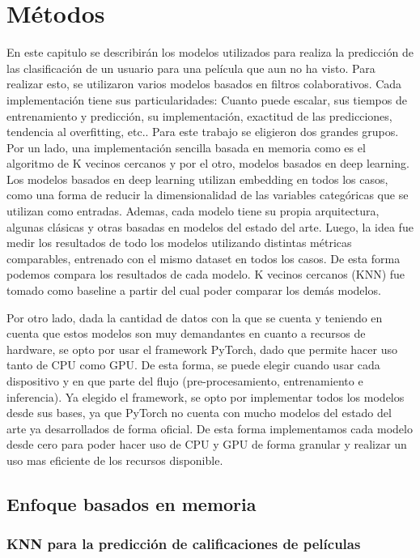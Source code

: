 \documentclass[11pt,a4paper,twoside]{thesis}
\begin{document}
\chapter{Métodos}

En este capitulo se describirán los modelos utilizados para realiza la predicción de las clasificación de un usuario para una película
que aun no ha visto. Para realizar esto, se utilizaron varios modelos basados en filtros colaborativos. Cada implementación tiene sus particularidades: 
Cuanto puede escalar, sus tiempos de entrenamiento y predicción, su implementación, exactitud de las predicciones, tendencia al overfitting, etc..
Para este trabajo se eligieron dos grandes grupos. Por un lado, una implementación sencilla basada en memoria como es el algoritmo de K vecinos cercanos y 
por el otro, modelos basados en deep learning. Los modelos basados en deep learning utilizan embedding en todos los casos, como una forma de reducir la 
dimensionalidad de las variables categóricas que se utilizan como entradas. Ademas, cada modelo tiene su propia arquitectura, algunas clásicas y otras basadas 
en modelos del estado del arte. Luego, la idea fue medir los resultados de todo los modelos utilizando distintas métricas comparables, entrenado con el mismo
dataset en todos los casos. De esta forma podemos compara los resultados de cada modelo. K vecinos cercanos (KNN) fue tomado como baseline a partir del cual 
poder comparar los demás modelos.

Por otro lado, dada la cantidad de datos con la que se cuenta y teniendo en cuenta que estos modelos son muy 
demandantes en cuanto a recursos de hardware, se opto por usar el framework PyTorch, dado que permite hacer uso tanto de CPU como GPU. 
De esta forma, se puede elegir cuando usar cada dispositivo y en que parte del flujo (pre-procesamiento, entrenamiento 
e inferencia). Ya elegido el framework, se opto por implementar todos los modelos desde sus bases, ya que PyTorch no cuenta con mucho
modelos del estado del arte ya desarrollados de forma oficial. De esta forma implementamos cada modelo desde cero para poder hacer uso de CPU y GPU de forma granular
y realizar un uso mas eficiente de los recursos disponible.

\section{Enfoque basados en memoria}

\subsection{KNN para la predicción de calificaciones de películas}
\end{document}
